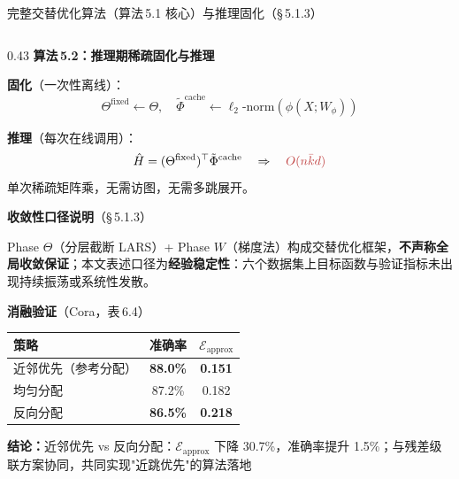 \documentclass[aspectratio=169,9pt,xcolor=dvipsnames]{beamer}
\newcommand{\highlight}[1]{\textcolor{myred}{\textbf{#1}}}
\newcommand{\blue}[1]{\textcolor{mynavy}{#1}}
\newcommand{\green}[1]{\textcolor{mygreen}{#1}}
\newcommand{\kbar}{\ensuremath{\bar{k}}}
\begin{document}
\begin{frame}{完整交替优化算法（算法\,5.1 核心）与推理固化（§\,5.1.3）}
\begin{columns}[T]
\begin{column}{0.43\textwidth}
  \textbf{\blue{算法\,5.2：推理期稀疏固化与推理}}

  \vspace{0.05cm}
  {\small
  \textbf{固化}（一次性离线）：
  \begin{equation*}
    \Theta^{\mathrm{fixed}}\leftarrow\Theta,\quad
    \tilde{\Phi}^{\mathrm{cache}}\leftarrow\ell_2\text{-norm}(\phi(X;W_\phi))
  \end{equation*}

  \textbf{推理}（每次在线调用）：
  \begin{equation*}
    \hat{H}=(\Theta^{\mathrm{fixed}})^\top\tilde{\Phi}^{\mathrm{cache}}
    \quad\Rightarrow\quad {\color{myred}O(n\kbar d)}
  \end{equation*}
  单次稀疏矩阵乘，无需访图，无需多跳展开。
  }

  \vspace{0.1cm}
  \textbf{\blue{收敛性口径说明}}（§\,5.1.3）

  {\small Phase $\Theta$（分层截断 LARS）+ Phase $W$（梯度法）构成交替优化框架，\textbf{不声称全局收敛保证}；本文表述口径为\textbf{经验稳定性}：六个数据集上目标函数与验证指标未出现持续振荡或系统性发散。}

  \vspace{0.1cm}
  \textbf{\blue{消融验证}}（Cora，表\,6.4）

  {\small
  \begin{tabular}{lcc}
    \toprule
    策略 & 准确率 & $\mathcal{E}_{\mathrm{approx}}$ \\
    \midrule
    近邻优先（参考分配） & \green{\textbf{88.0\%}} & \green{\textbf{0.151}} \\
    均匀分配 & 87.2\% & 0.182 \\
    反向分配 & \highlight{86.5\%} & \highlight{0.218} \\
    \bottomrule
  \end{tabular}

  \vspace{0.1cm}
  \highlight{结论：}近邻优先 vs 反向分配：$\mathcal{E}_{\mathrm{approx}}$ 下降 30.7\%，准确率提升 1.5\%；与残差级联方案协同，共同实现"近跳优先"的算法落地
  }
\end{column}
\end{columns}
\end{frame}
\end{document}
